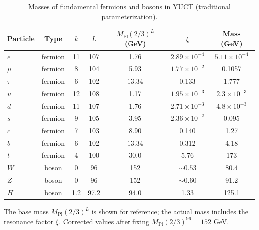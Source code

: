 \documentclass[11pt,a4paper]{article}
\begin{document}
	\vspace{2.0cm}
	
	\begin{table}[H]
		\centering
		\caption{Masses of fundamental fermions and bosons in YUCT (traditional parameterization).}
		\label{tab:fermions}
		\normalsize
		\begin{tabular}{l c c c c c c}
			\toprule
			Particle & Type & \(k\) & \(L\) & \(M_{\mathrm{Pl}}(2/3)^L\) (GeV) & \(\xi\) & Mass (GeV) \\
			\midrule
			\(e\) & fermion & 11 & 107 & 1.76 & \(2.89\times10^{-4}\) & \(5.11\times10^{-4}\) \\
			\(\mu\) & fermion & 8  & 104 & 5.93 & \(1.77\times10^{-2}\) & 0.1057 \\
			\(\tau\) & fermion & 6  & 102 & 13.34 & 0.133 & 1.777 \\
			\(u\) & fermion & 12 & 108 & 1.17 & \(1.95\times10^{-3}\) & \(2.3\times10^{-3}\) \\
			\(d\) & fermion & 11 & 107 & 1.76 & \(2.71\times10^{-3}\) & \(4.8\times10^{-3}\) \\
			\(s\) & fermion & 9  & 105 & 3.95 & \(2.36\times10^{-2}\) & 0.095 \\
			\(c\) & fermion & 7  & 103 & 8.90 & 0.140 & 1.27 \\
			\(b\) & fermion & 6  & 102 & 13.34 & 0.312 & 4.18 \\
			\(t\) & fermion & 4  & 100 & 30.0 & 5.76 & 173 \\
			\midrule
			\(W\) & boson & 0 & 96 & 152 & \(\sim0.53\) & 80.4 \\
			\(Z\) & boson & 0 & 96 & 152 & \(\sim0.60\) & 91.2 \\
			\(H\) & boson & 1.2 & 97.2 & 94.0 & 1.33 & 125.1 \\
			\bottomrule
		\end{tabular}
		\par\smallskip
		\footnotesize The base mass \(M_{\mathrm{Pl}}(2/3)^L\) is shown for reference; the actual mass includes the resonance factor \(\xi\). Corrected values after fixing \(M_{\mathrm{Pl}}(2/3)^{96}=152\) GeV.
	\end{table}
	
\end{document}
